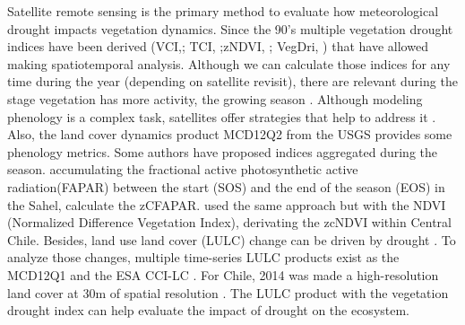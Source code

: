 \documentclass[preprint,
3p]{elsarticle} %
\begin{document}
Satellite remote sensing \citep{West2019, AghaKouchak2015} is the
primary method to evaluate how meteorological drought impacts vegetation
dynamics. Since the 90's multiple vegetation drought indices have been
derived (VCI,\citep{Kogan1990}; TCI, \citep{Kogan1995};zNDVI,
\citep{Peters2002}; VegDri, \citep{Brown2008}) that have allowed making
spatiotemporal analysis. Although we can calculate those indices for any
time during the year (depending on satellite revisit), there are
relevant during the stage vegetation has more activity, the growing
season \citep{Mishra2015}. Although modeling phenology is a complex
task, satellites offer strategies that help to address it
\citep{Younes2021, Vrieling2018, Cai2017}. Also, the land cover dynamics
product MCD12Q2 from the USGS \citep{Friedl2019} provides some phenology
metrics. Some authors have proposed indices aggregated during the
season. \citet{Meroni2017} accumulating the fractional active
photosynthetic active radiation(FAPAR) between the start (SOS) and the
end of the season (EOS) in the Sahel, calculate the zCFAPAR.
\citet{Zambrano2018} used the same approach but with the NDVI
(Normalized Difference Vegetation Index), derivating the zcNDVI within
Central Chile. Besides, land use land cover (LULC) change can be driven
by drought \citep{Tran2019, Akinyemi2021}. To analyze those changes,
multiple time-series LULC products exist as the MCD12Q1
\citep{Friedl2019} and the ESA CCI-LC \citep{ESA2017}. For Chile, 2014
was made a high-resolution land cover at 30m of spatial resolution
\citep{Zhao2016}. The LULC product with the vegetation drought index can
help evaluate the impact of drought on the ecosystem.
\end{document}
